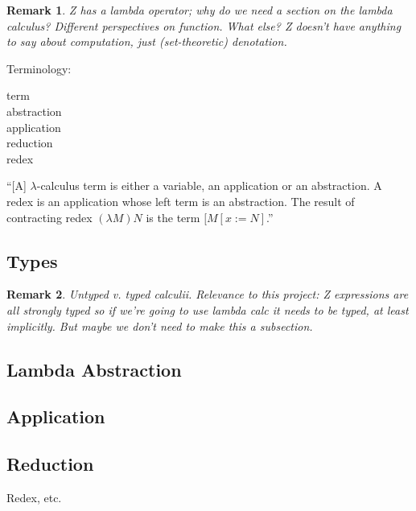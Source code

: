 \documentclass[12pt]{tufte-handout}
\numberwithin{equation}{subsection}
\numberwithin{equation}{subsection}
\newtheorem{remark}{Remark}
\begin{document}
\begin{remark}
  Z has a lambda operator; why do we need a section on the lambda
  calculus?  Different perspectives on function.  What else?  Z
  doesn't have anything to say about computation, just (set-theoretic)
  denotation.
\end{remark}

Terminology:
\begin{description}
\item [term]
\item [abstraction]
\item [application]
\item [reduction]
\item [redex]
\end{description}

``[A] \(\lambda\)-calculus term is either a variable, an application
or an abstraction.  A redex is an application whose left term is an
abstraction.  The result of contracting redex \((\lambda M) N\) is the
term \([M[x:=N]\).''

  \subsection{Types}
  \label{subs:lambdatypes}

  \begin{remark}
    Untyped v. typed calculii.  Relevance to this project: Z expressions
    are all strongly typed so if we're going to use lambda calc it needs
    to be typed, at least implicitly.  But maybe we don't need to make
    this a subsection.
  \end{remark}

  \subsection{Lambda Abstraction}
  \label{subs:lambda}

  \subsection{Application}
  \label{subs:applic}

  \subsection{Reduction}
  \label{subs:reduction}

  Redex, etc.
\end{document}
